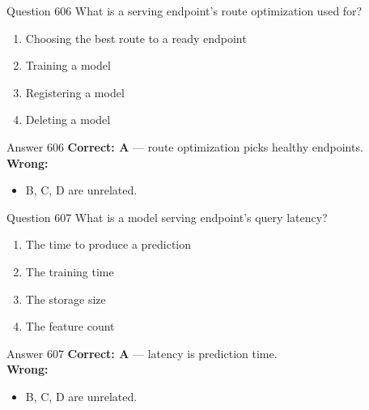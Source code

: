 \documentclass[aspectratio=169,11pt]{beamer}
\begin{document}
	\begin{frame}{Question 606}
		What is a serving endpoint's route optimization used for?
		\begin{enumerate}[label=\Alph*.]
			\item Choosing the best route to a ready endpoint
			\item Training a model
			\item Registering a model
			\item Deleting a model
		\end{enumerate}
	\end{frame}
	\begin{frame}{Answer 606}
		\textbf{Correct: A} --- route optimization picks healthy endpoints.\\
		\vspace{0.5em}
		\textbf{Wrong:}
		\begin{itemize}
			\item B, C, D are unrelated.
		\end{itemize}
	\end{frame}
	
	\begin{frame}{Question 607}
		What is a model serving endpoint's query latency?
		\begin{enumerate}[label=\Alph*.]
			\item The time to produce a prediction
			\item The training time
			\item The storage size
			\item The feature count
		\end{enumerate}
	\end{frame}
	\begin{frame}{Answer 607}
		\textbf{Correct: A} --- latency is prediction time.\\
		\vspace{0.5em}
		\textbf{Wrong:}
		\begin{itemize}
			\item B, C, D are unrelated.
		\end{itemize}
	\end{frame}
	
\end{document}
